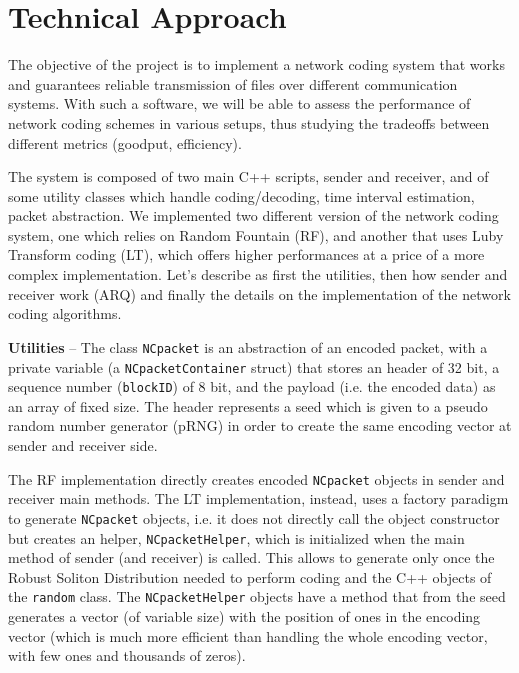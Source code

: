 \section{Technical Approach}\label{sec:impl}
\setlength{\abovecaptionskip}{10pt plus 3pt minus 2pt}

The objective of the project is to implement a network coding system that works and guarantees reliable transmission of files over different communication systems. With such a software, we will be able to assess the performance of network coding schemes in various setups, thus studying the tradeoffs between different metrics (goodput, efficiency).

The system is composed of two main C++ scripts, sender and receiver, and of some utility classes which handle coding/decoding, time interval estimation, packet abstraction. We implemented two different version of the network coding system, one which relies on Random Fountain (RF), and another that uses Luby Transform coding (LT), which offers higher performances at a price of a more complex implementation. Let's describe as first the utilities, then how sender and receiver work (ARQ) and finally the details on the implementation of the network coding algorithms.

\textbf{Utilities} -- The class \texttt{NCpacket} is an abstraction of an encoded packet, with a private variable (a \texttt{NCpacketContainer} struct) that stores an header of 32 bit, a sequence number (\texttt{blockID}) of 8 bit, and the payload (i.e. the encoded data) as an array of fixed size. 
The header represents a seed which is given to a pseudo random number generator (pRNG) in order to create the same encoding vector at sender and receiver side. 

The RF implementation directly creates encoded \texttt{NCpacket} objects in sender and receiver main methods.
The LT implementation, instead, uses a factory paradigm to generate \texttt{NCpacket} objects, i.e. it does not directly call the object constructor but creates an helper, \texttt{NCpacketHelper}, which is initialized when the main method of sender (and receiver) is called. This allows to generate only once the Robust Soliton Distribution needed to perform coding and the C++ objects of the \texttt{random} class. The \texttt{NCpacketHelper} objects have a method that from the seed generates a vector (of variable size) with the position of ones in the encoding vector (which is much more efficient than handling the whole encoding vector, with few ones and thousands of zeros).

